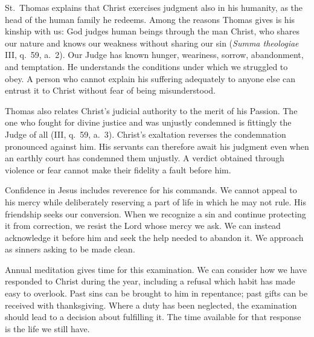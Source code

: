 St.~Thomas explains that Christ exercises judgment also in his humanity, as the head of the human family he redeems. Among the reasons Thomas gives is his kinship with us: God judges human beings through the man Christ, who shares our nature and knows our weakness without sharing our sin (\emph{Summa theologiae} III, q.~59, a.~2). Our Judge has known hunger, weariness, sorrow, abandonment, and temptation. He understands the conditions under which we struggled to obey. A person who cannot explain his suffering adequately to anyone else can entrust it to Christ without fear of being misunderstood.

Thomas also relates Christ's judicial authority to the merit of his Passion. The one who fought for divine justice and was unjustly condemned is fittingly the Judge of all (III, q.~59, a.~3). Christ's exaltation reverses the condemnation pronounced against him. His servants can therefore await his judgment even when an earthly court has condemned them unjustly. A verdict obtained through violence or fear cannot make their fidelity a fault before him.

Confidence in Jesus includes reverence for his commands. We cannot appeal to his mercy while deliberately reserving a part of life in which he may not rule. His friendship seeks our conversion. When we recognize a sin and continue protecting it from correction, we resist the Lord whose mercy we ask. We can instead acknowledge it before him and seek the help needed to abandon it. We approach as sinners asking to be made clean.

Annual meditation gives time for this examination. We can consider how we have responded to Christ during the year, including a refusal which habit has made easy to overlook. Past sins can be brought to him in repentance; past gifts can be received with thanksgiving. Where a duty has been neglected, the examination should lead to a decision about fulfilling it. The time available for that response is the life we still have.

